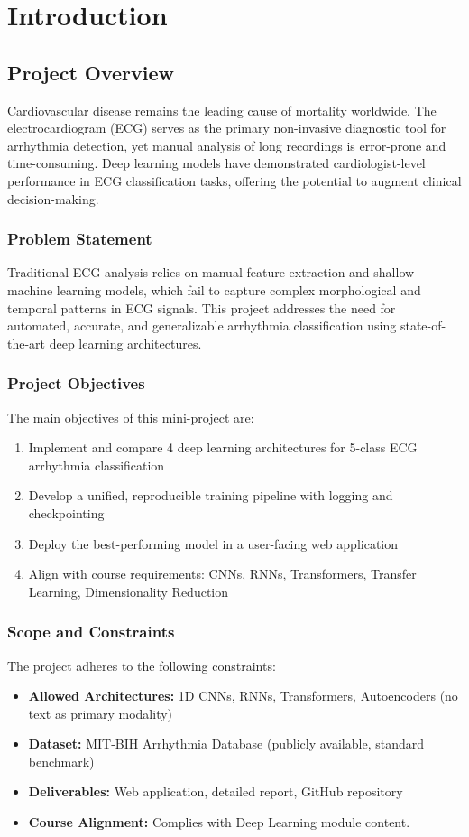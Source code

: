 \part{Introduction}

\chapter{Project Overview}
\label{chap:introduction}

Cardiovascular disease remains the leading cause of mortality worldwide. The electrocardiogram (ECG) serves as the primary non-invasive diagnostic tool for arrhythmia detection, yet manual analysis of long recordings is error-prone and time-consuming. Deep learning models have demonstrated cardiologist-level performance in ECG classification tasks, offering the potential to augment clinical decision-making.

\section{Problem Statement}
Traditional ECG analysis relies on manual feature extraction and shallow machine learning models, which fail to capture complex morphological and temporal patterns in ECG signals. This project addresses the need for automated, accurate, and generalizable arrhythmia classification using state-of-the-art deep learning architectures.

\section{Project Objectives}
The main objectives of this mini-project are:
\begin{enumerate}
    \item Implement and compare 4 deep learning architectures for 5-class ECG arrhythmia classification
    \item Develop a unified, reproducible training pipeline with logging and checkpointing
    \item Deploy the best-performing model in a user-facing web application
    \item Align with course requirements: CNNs, RNNs, Transformers, Transfer Learning, Dimensionality Reduction
\end{enumerate}

\section{Scope and Constraints}
The project adheres to the following constraints:
\begin{itemize}
    \item \textbf{Allowed Architectures:} 1D CNNs, RNNs, Transformers, Autoencoders (no text as primary modality)
    \item \textbf{Dataset:} MIT-BIH Arrhythmia Database (publicly available, standard benchmark)
    \item \textbf{Deliverables:} Web application, detailed report, GitHub repository
    \item \textbf{Course Alignment:} Complies with Deep Learning module content.
\end{itemize}

